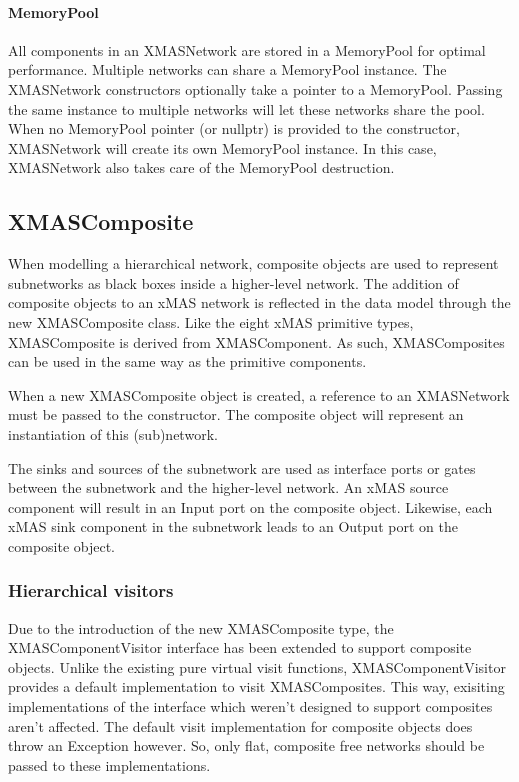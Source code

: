 \paragraph{MemoryPool}
All components in an XMASNetwork are stored in a MemoryPool for optimal performance.
Multiple networks can share a MemoryPool instance. The XMASNetwork constructors
optionally take a pointer to a MemoryPool. Passing the same instance to multiple
networks will let these networks share the pool. When no MemoryPool pointer (or
nullptr) is provided to the constructor, XMASNetwork will create its own
MemoryPool instance. In this case, XMASNetwork also takes care of the MemoryPool
destruction.


\subsection{XMASComposite}

When modelling a hierarchical network, composite objects are used to represent
subnetworks as black boxes inside a higher-level network. The addition of
composite objects to an xMAS network is reflected in the data model through the
new XMASComposite class. Like the eight xMAS primitive types, XMASComposite
is derived from XMASComponent. As such, XMASComposites can be used in the same
way as the primitive components.

When a new XMASComposite object is created, a reference to an XMASNetwork must
be passed to the constructor. The composite object will represent an
instantiation of this (sub)network.

The sinks and sources of the subnetwork are used as interface ports or gates
between the subnetwork and the higher-level network. An xMAS source component
will result in an Input port on the composite object. Likewise, each xMAS sink
component in the subnetwork leads to an Output port on the composite object.

\subsubsection{Hierarchical visitors}

Due to the introduction of the new XMASComposite type, the XMASComponentVisitor
interface has been extended to support composite objects. Unlike the existing
pure virtual visit functions, XMASComponentVisitor provides a default
implementation to visit XMASComposites. This way, exisiting implementations of
the interface which weren't designed to support composites aren't affected. The
default visit implementation for composite objects does throw an Exception however.
So, only flat, composite free networks should be passed to these implementations.


